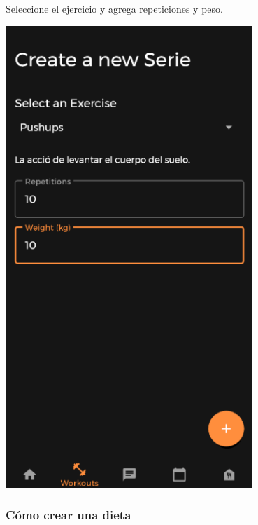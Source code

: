 \documentclass[12pt,a4paper]{article}
\begin{document}
\begin{enumerate}
\begin{minipage}{.60\textwidth}
  \item Seleccione el ejercicio y agrega repeticiones y peso.
\end{minipage}
\begin{minipage}{.40\textwidth}
  \includegraphics[width=0.7\textwidth, right]{crearseries}
\end{minipage}
\end{enumerate}


\clearpage

\subsubsection{Cómo crear una dieta}
\end{document}
